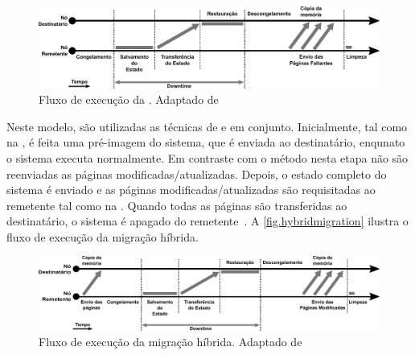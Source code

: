 \begin{figure}[bt]
    \centering
    \includegraphics[width=0.8\linewidth]{content/images/post-copy-migration-flow.pdf}
    \caption{Fluxo de execução da \postcopymigration. Adaptado de~\cite{migrationimages}}
    \label{fig.postcopy}
\end{figure}


\label{sec.hybridmigration}
Neste modelo, são utilizadas as técnicas de \precopy e \postcopy em conjunto. Inicialmente, tal como na \precopymigration, é feita uma pré-imagem do sistema, que é enviada ao destinatário, enqunato o sistema executa normalmente. Em contraste com o método \precopy nesta etapa não são reenviadas as páginas modificadas/atualizadas. Depois, o estado completo do sistema é enviado e as páginas modificadas/atualizadas são requisitadas ao remetente tal como na \postcopymigration. Quando todas as páginas são transferidas ao destinatário, o sistema é apagado do remetente~\cite{singh2022predictive, imran2022live}. A \autoref{fig.hybridmigration} ilustra o fluxo de execução da migração híbrida.

\begin{figure}[bt]
    \centering
    \includegraphics[width=0.8\linewidth]{content/images/hybrid-migration-flow.pdf}
    \caption{Fluxo de execução da migração híbrida. Adaptado de~\cite{migrationimages}}
    \label{fig.hybridmigration}
\end{figure}


